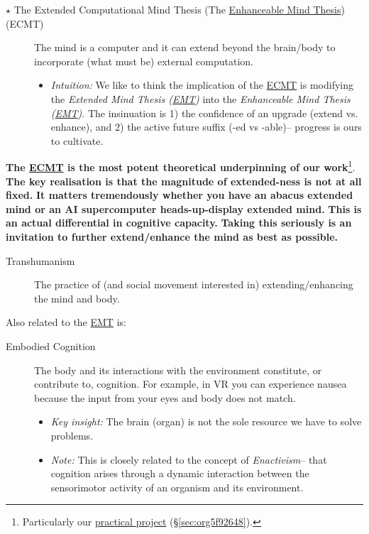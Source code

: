 \documentclass[logo,bsc,singlespacing,parskip]{infthesis}
\begin{document}
{\begin{mdframed}
\begin{description}
\item[{\(\star\) The Extended Computational Mind Thesis (The \hyperref[org33f9226]{Enhanceable Mind Thesis}) (\label{org760d146}ECMT)}] The mind is a computer and it can extend beyond the brain/body to incorporate (what must be) external computation.
\begin{itemize}
\item \emph{Intuition:} We like to think the implication of the \hyperref[org760d146]{ECMT} is modifying the \emph{Extended Mind Thesis (\hyperref[org3b15c2d]{EMT})} into the \emph{\label{org33f9226}Enhanceable Mind Thesis (\hyperref[org3b15c2d]{EMT})}.
The insinuation is 1) the confidence of an upgrade (extend vs. enhance), and 2) the active future suffix (-ed vs -able)-- progress is ours to cultivate.
\end{itemize}
\end{description}
\end{mdframed}

\textbf{The \hyperref[org760d146]{ECMT} is the most potent theoretical underpinning of our work}\footnote{Particularly our \hyperref[sec:org5f92648]{practical project} (\S \ref{sec:org5f92648}).}.
\textbf{The key realisation is that the magnitude of extended-ness is not at all fixed.}
\textbf{It matters tremendously whether you have an abacus extended mind or an AI supercomputer heads-up-display extended mind.}
\textbf{This is an actual differential in cognitive capacity.}
\textbf{Taking this seriously is an invitation to further extend/enhance the mind as best as possible.}

\begin{mdframed}
\begin{description}
\item[{\label{orgdc9cd5b}Transhumanism}] The practice of (and social movement interested in) extending/enhancing the mind and body.
\end{description}
\end{mdframed}

Also related to the \hyperref[org3b15c2d]{EMT} is:

\begin{mdframed}
\begin{description}
\item[{\label{orgef09c3f}Embodied Cognition}] The body and its interactions with the environment constitute, or contribute to, cognition.
For example, in VR you can experience nausea because the input from your eyes and body does not match.
\begin{itemize}
\item \emph{Key insight:} The brain (organ) is not the sole resource we have to solve problems.
\item \emph{Note:} This is closely related to the concept of \emph{Enactivism}-- that cognition arises through a dynamic interaction between the sensorimotor activity of an organism and its environment.
\end{itemize}
\end{description}
\end{mdframed}

}
\end{document}
